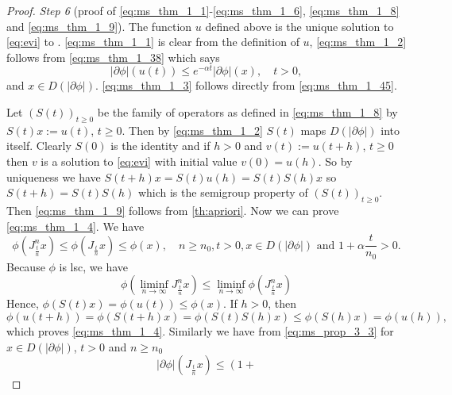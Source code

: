 \documentclass[a4paper,11pt, leqno]{scrreprt} %
\renewcommand{\leq}{\leqslant}
\renewcommand{\leq}{\leqslant}
\renewcommand{\geq}{\geqslant}
\theoremstyle{change}
\theoremstyle{nonumberplain}
\newtheorem{proof}{Proof}
\begin{document}
\begin{proof}
  \textit{Step 6} (proof of
  \eqref{eq:ms_thm_1_1}-\eqref{eq:ms_thm_1_6}, \eqref{eq:ms_thm_1_8}
  and \eqref{eq:ms_thm_1_9}). The function $u$ defined above is the
  unique solution to \eqref{eq:evi} to
  . \eqref{eq:ms_thm_1_1} is clear from the
  definition of $u$, \eqref{eq:ms_thm_1_2} follows from
  \eqref{eq:ms_thm_1_38} which says
  \begin{equation}
    \label{eq:ms_thm_1_65}
    |\partial \phi|(u(t)) \leq e^{-\alpha t} |\partial \phi|(x), \quad
    t > 0,
  \end{equation}
  and $x \in D(|\partial \phi|)$. \eqref{eq:ms_thm_1_3} follows
  directly from
  \eqref{eq:ms_thm_1_45}.

  Let $(S(t))_{t \geq 0}$ be the family of operators as defined in
  \eqref{eq:ms_thm_1_8} by $S(t) x := u(t)$, $t \geq 0$. Then by
  \eqref{eq:ms_thm_1_2} $S(t)$ maps $D(|\partial \phi|)$ into
  itself. Clearly $S(0)$ is the identity and if $h > 0$ and $v(t) :=
  u(t + h)$, $t \geq 0$ then $v$ is a solution to \eqref{eq:evi} with
  initial value $v(0) = u(h)$. So by uniqueness we have $S(t + h)x =
  S(t)u(h) = S(t)S(h)x$ so $S(t + h) = S(t) S(h)$ which is the
  semigroup property of $(S(t))_{t \geq 0}$. Then
  \eqref{eq:ms_thm_1_9} follows from \eqref{th:apriori}. Now we can
  prove \eqref{eq:ms_thm_1_4}. We have
  \begin{equation}
    \label{eq:ms_thm_1_66}
    \phi \left ( J_{\frac{t}{n}}^n x \right ) \leq \phi \left
      (J_{\frac{t}{n}} x \right ) \leq \phi(x), \quad n \geq n_0, t > 0, x \in
      D(|\partial \phi|) \text{ and } 1 + \alpha \frac{t}{n_0} > 0.
  \end{equation}
  Because $\phi$ is lsc, we have
  \begin{equation}
    \label{eq:ms_thm_1_67}
    \phi \left ( \liminf_{n \to \infty} J_\frac{t}{n}^n x \right ) \leq
    \liminf_{n \to \infty} \phi \left ( J_\frac{t}{n}^n x \right )
  \end{equation}
  Hence, $\phi(S(t)x) = \phi(u(t)) \leq \phi(x)$. If $h > 0$, then
  \begin{equation}
    \label{eq:ms_thm_1_68}
    \phi(u(t + h)) = \phi(S(t + h)x) = \phi(S(t)S(h)x) \leq
    \phi(S(h)x) = \phi(u(h)),
  \end{equation}
  which proves \eqref{eq:ms_thm_1_4}. Similarly we have from
  \eqref{eq:ms_prop_3_3} for $x \in D(|\partial \phi|)$, $t > 0$ and
  $n \geq n_0$
  \begin{equation}
    \label{eq:ms_thm_1_69}
    |\partial \phi| \left (J_{\frac{t}{n}} x \right ) \leq \left ( 1 +

\end{equation}
\end{proof}
\end{document}
